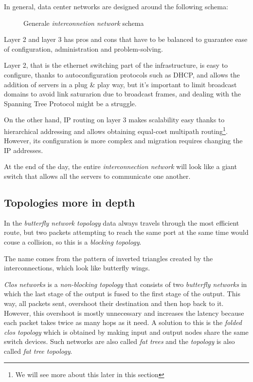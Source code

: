 \bigskip\noindent
In general, data center networks are designed around the following schema:
\begin{figure}[h!]
    \centering
    \caption{Generale \emph{interconnetion network} schema}
\end{figure}

\noindent
Layer 2 and layer 3 has pros and cons that have to be balanced to guarantee ease
of configuration, administration and problem-solving.

Layer 2, that is the ethernet switching part of the infrastructure, is easy to
configure, thanks to autoconfiguration protocols such as DHCP, and allows the
addition of servers in a plug \& play way, but it's important to limit broadcast
domains to avoid link saturarion due to broadcast frames, and dealing with the
Spanning Tree Protocol might be a struggle.

On the other hand, IP routing on layer 3 makes scalability easy thanks to
hierarchical addressing and allows obtaining equal-cost multipath
routing\footnote{We will see more about this later in this section}. However,
its configuration is more complex and migration requires changing the IP addresses.

\begin{note}
    At the end of the day, the entire \emph{interconnection network} will look
    like a giant switch that allows all the servers to communicate one another.
\end{note}

\subsection{Topologies more in depth}
In the \emph{butterfly network topology} data always travels through the most
efficient route, but two packets attempting to reach the same port at the same
time would couse a collision, so this is a \emph{blocking topology}.
\begin{note}
    The name comes from the pattern of inverted triangles created by the
    interconnections, which look like butterfly wings.
\end{note}
\emph{Clos networks} is a \emph{non-blocking topology} that consists of two
\emph{butterfly networks} in which the last stage of the output is fused to the
first stage of the output. This way, all packets sent, overshoot their destination
and then hop back to it. However, this overshoot is mostly unnecessary and
increases the latency because each packet takes twice as many hops as it need.
A solution to this is the \emph{folded clos topology} which is obtained by
making input and output nodes share the same switch devices. Such networks are
also called \emph{fat trees} and the \emph{topology} is also called
\emph{fat tree topology}.

